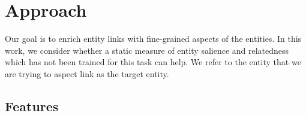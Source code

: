 \documentclass[sigconf,authordraft]{acmart}
\begin{document}
\section{Approach}
\label{sec:Approach}
Our goal is to enrich entity links with fine-grained aspects of the entities. In this work, we consider whether a static measure of entity salience and relatedness which has not been trained for this task can help. We refer to the entity that we are trying to aspect link as the target entity.


\subsection{Features}
\label{subsec:Features}
\end{document}
